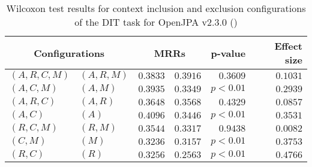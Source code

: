 
\begin{table}
\begin{spacing}{1.2}
\centering
\caption{Wilcoxon test results for context inclusion and exclusion configurations of the DIT task for OpenJPA v2.3.0 (\ctwo)}
\label{table:versus-wilcox-openjpa-dit-context}
\begin{tabular}{ll|rr|rr}
\toprule
      \multicolumn{2}{c|}{Configurations} &                \multicolumn{2}{c|}{MRRs} &             p-value & Effect size \\
\midrule
 $(A,R,C,M)$ &  $(A,R,M)$ &       $0.3833$ &  $\bm{0.3916}$ & $0.3609$ &    $0.1031$ \\
   $(A,C,M)$ &    $(A,M)$ &  $\bm{0.3935}$ &       $0.3349$ & $p<0.01$ &    $0.2939$ \\
   $(A,R,C)$ &    $(A,R)$ &  $\bm{0.3648}$ &       $0.3568$ & $0.4329$ &    $0.0857$ \\
     $(A,C)$ &      $(A)$ &  $\bm{0.4096}$ &       $0.3446$ & $p<0.01$ &    $0.3531$ \\
   $(R,C,M)$ &    $(R,M)$ &  $\bm{0.3544}$ &       $0.3317$ & $0.9438$ &    $0.0082$ \\
     $(C,M)$ &      $(M)$ &  $\bm{0.3236}$ &       $0.3157$ & $p<0.01$ &    $0.3753$ \\
     $(R,C)$ &      $(R)$ &  $\bm{0.3256}$ &       $0.2563$ & $p<0.01$ &    $0.4766$ \\
\bottomrule
\end{tabular}

\end{spacing}
\end{table}

